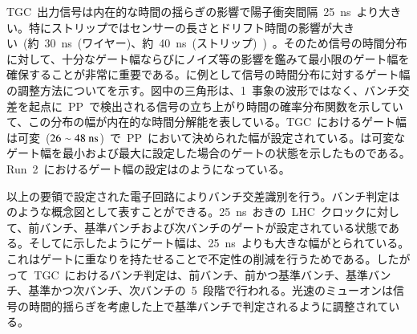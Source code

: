 TGC~出力信号は内在的な時間の揺らぎの影響で陽子衝突間隔~25~ns~より大きい。特にストリップではセンサーの長さとドリフト時間の影響が大きい~(約~30~ns~(ワイヤー)、約~40~ns~(ストリップ)~)~。そのため信号の時間分布に対して、十分なゲート幅ならびにノイズ等の影響を鑑みて最小限のゲート幅を確保することが非常に重要である。に例として信号の時間分布に対するゲート幅の調整方法についてを示す。図中の三角形は、1~事象の波形ではなく、バンチ交差を起点に~PP~で検出される信号の立ち上がり時間の確率分布関数を示していて、この分布の幅が内在的な時間分解能を表している。TGC~におけるゲート幅は可変~($\rm{26\sim48~ns}$)~で~PP~において決められた幅が設定されている。は可変なゲート幅を最小および最大に設定した場合のゲートの状態を示したものである。Run~2~におけるゲート幅の設定はのようになっている。

以上の要領で設定された電子回路によりバンチ交差識別を行う。バンチ判定はのような概念図として表すことができる。25~ns~おきの~LHC~クロックに対して、前バンチ、基準バンチおよび次バンチのゲートが設定されている状態である。そしてに示したようにゲート幅は、25~ns~よりも大きな幅がとられている。これはゲートに重なりを持たせることで不定性の削減を行うためである。したがって~TGC~におけるバンチ判定は、前バンチ、前かつ基準バンチ、基準バンチ、基準かつ次バンチ、次バンチの~5~段階で行われる。光速のミューオンは信号の時間的揺らぎを考慮した上で基準バンチで判定されるように調整されている。

